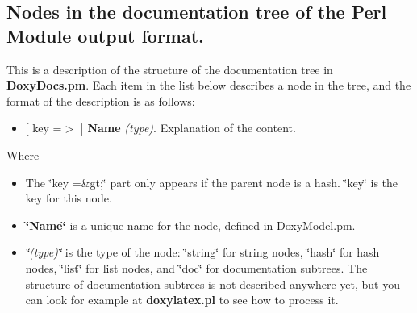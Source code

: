 \subsection*{Nodes in the documentation tree of the Perl Module output format.}

This is a description of the structure of the documentation tree in {\bf DoxyDocs.pm}. Each item in the list below describes a node in the tree, and the format of the description is as follows:

\begin{itemize}
\item \mbox{[} key =$>$ \mbox{]} {\bf Name} {\em (type)\/}. Explanation of the content. \end{itemize}


Where

\begin{itemize}
\item The \char`\"{}key =\&gt;\char`\"{} part only appears if the parent node is a hash. \char`\"{}key\char`\"{} is the key for this node.

\item {\bf \char`\"{}Name\char`\"{}} is a unique name for the node, defined in DoxyModel.pm.

\item {\em \char`\"{}(type)\char`\"{}\/} is the type of the node: \char`\"{}string\char`\"{} for string nodes, \char`\"{}hash\char`\"{} for hash nodes, \char`\"{}list\char`\"{} for list nodes, and \char`\"{}doc\char`\"{} for documentation subtrees. The structure of documentation subtrees is not described anywhere yet, but you can look for example at {\bf doxylatex.pl} to see how to process it.

\end{itemize}


